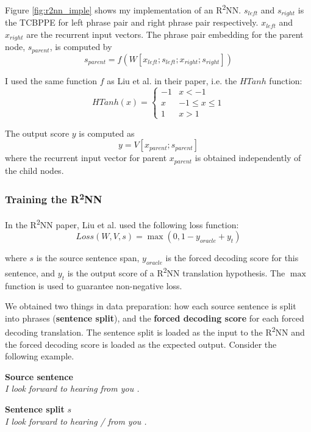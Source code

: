 \documentclass[12pt,a4paper,twoside,openright]{report}
\begin{document}
Figure \ref{fig:r2nn_imple} shows my implementation of an R\textsuperscript{2}NN. $s_{left}$ and $s_{right}$ is the TCBPPE for left phrase pair and right phrase pair respectively. $x_{left}$ and $x_{right}$ are the recurrent input vectors. The phrase pair embedding for the parent node, $s_{parent}$, is computed by
\[ s_{parent} = f(W[x_{left};s_{left};x_{right};s_{right}]) \]

I used the same function $f$ as Liu et al. in their paper\cite{r2nn}, i.e. the $HTanh$ function:
\[ HTanh(x) =
    \begin{cases} 
      -1 & x < -1 \\
      x & -1\leq x\leq 1 \\
      1 & x > 1 
   \end{cases}
\]

The output score $y$ is computed as
\[ y = V[x_{parent}; s_{parent}] \]
where the recurrent input vector for parent $x_{parent}$ is obtained independently of the child nodes.

\subsubsection{Training the \texorpdfstring{R\textsuperscript{2}NN}{R2NN}}

In the R\textsuperscript{2}NN paper\cite{r2nn}, Liu et al. used the following loss function:
\begin{equation}
\label{eq:loss}
Loss(W,V,s) = \max{(0, 1-y_{oracle} + y_t)}
\end{equation}

where $s$ is the source sentence span, $y_{oracle}$ is the forced decoding score for this sentence, and $y_t$ is the output score of a R\textsuperscript{2}NN translation hypothesis. The $\max$ function is used to guarantee non-negative loss.

We obtained two things in data preparation: how each source sentence is split into phrases (\textbf{sentence split}), and the \textbf{forced decoding score} for each forced decoding translation. The sentence split is loaded as the input to the R\textsuperscript{2}NN and the forced decoding score is loaded as the expected output. Consider the following example.

\textbf{Source sentence}\\
\textit{I look forward to hearing from you .}

\textbf{Sentence split} $s$\\
\textit{I look forward to hearing / from you .}
\end{document}
